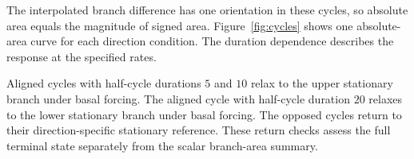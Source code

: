 The interpolated branch difference has one orientation in these cycles, so absolute area equals the magnitude of signed area. Figure~\ref{fig:cycles} shows one absolute-area curve for each direction condition. The duration dependence describes the response at the specified rates.

Aligned cycles with half-cycle durations $5$ and $10$ relax to the upper stationary branch under basal forcing. The aligned cycle with half-cycle duration $20$ relaxes to the lower stationary branch under basal forcing. The opposed cycles return to their direction-specific stationary reference. These return checks assess the full terminal state separately from the scalar branch-area summary.
